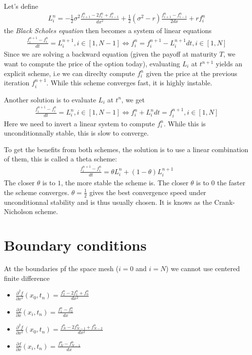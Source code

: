 \documentclass[a4paper]{article}
\begin{document}
Let's define
\begin{gather*}L_i^n = -\frac{1}{2}\sigma^2\frac{f_{i+1}^n - 2 f_i^n + f_{i-1}^n}{dx^2} + \frac{1}{2}(\sigma^2 - r)  \frac{f_{i+1}^n - f_{i-1}^n}{2dx} + rf_i^n
\end{gather*}  the \textit{Black Scholes equation} then becomes a system of linear equations
\begin{gather*}
\frac{f_i^{n+1} - f_i^{n}}{dt} = L_i^{n+1}, i \in [1, N-1] \Longleftrightarrow
f_i^n = f_i^{n+1} - L_i^{n+1}dt, i \in [1, N]
\end{gather*}
Since we are solving a backward equation (given the payoff at maturity $T$, we want to compute the price of the option today), evaluating $L_i$ 
at $t^{n+1}$ yields an explicit scheme, i.e we can direclty compute $f_i^n$ given the price at the previous iteration $f_i^{n+1}$. While this scheme
converges fast, it is highly instable.

Another solution is to evaluate $L_i$ at $t^n$, we get
\begin{gather*}
\frac{f_i^{n+1} - f_i^{n}}{dt} = L_i^{n}, i \in [1, N-1] \Longleftrightarrow
f_i^n + L_i^n dt = f_i^{n+1}, i \in [1, N]
\end{gather*}
Here we need to invert a linear system to compute $f_i^n$. While this is unconditionnally stable, this is slow to converge.

To get the benefits from both schemes, the solution is to use a linear combination of them, this is called a theta scheme:
\begin{gather*}
\frac{f_i^{n+1} - f_i^{n}}{dt} = \theta L_i^n + (1-\theta) L_i^{n+1}
\end{gather*}
The closer $\theta$ is to $1$, the more stable the scheme is. The closer $\theta$ is to $0$ the faster the scheme converges. $\theta = \frac{1}{2}$ gives
the best convergence speed under unconditionnal stability and is thus usually chosen. It is knows as the Crank-Nicholson scheme.

\section{Boundary conditions}

At the boundaries pf the space mesh ($i = 0$ and $i = N$) we cannot use centered finite difference
\begin{itemize}
\item $\frac{\partial^2 f}{\partial x^2}(x_0, t_n) = \frac{f_{2}^n - 2f_{1}^n + f_{0}^n}{dx^2}$
\item $\frac{\partial f}{\partial x}(x_i, t_n) = \frac{f_{1}^n - f_{0}^n}{dx}$
\item $\frac{\partial^2 f}{\partial x^2}(x_0, t_n) = \frac{f_{N}^n - 2f_{N-1}^n + f_{N-2}^n}{dx^2}$
\item $\frac{\partial f}{\partial x}(x_i, t_n) = \frac{f_{N}^n - f_{N-1}^n}{dx}$
\end{itemize}
\end{document}
